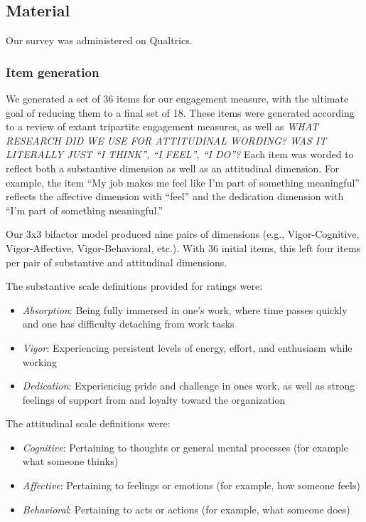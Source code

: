 \documentclass[
  english,
  man]{apa6}
\begin{document}
\hypertarget{material}{%
\subsection{Material}\label{material}}

Our survey was administered on Qualtrics.

\hypertarget{item-generation}{%
\subsubsection{Item generation}\label{item-generation}}

We generated a set of 36 items for our engagement measure, with the ultimate goal of reducing them to a final set of 18. These items were generated according to a review of extant tripartite engagement measures, as well as \emph{WHAT RESEARCH DID WE USE FOR ATTITUDINAL WORDING? WAS IT LITERALLY JUST \enquote{I THINK}, \enquote{I FEEL}, \enquote{I DO}?} Each item was worded to reflect both a substantive dimension as well as an attitudinal dimension. For example, the item \enquote{My job makes me feel like I'm part of something meaningful} reflects the affective dimension with \enquote{feel} and the dedication dimension with \enquote{I'm part of something meaningful.}

Our 3x3 bifactor model produced nine pairs of dimensions (e.g., Vigor-Cognitive, Vigor-Affective, Vigor-Behavioral, etc.). With 36 initial items, this left four items per pair of substantive and attitudinal dimensions.

The substantive scale definitions provided for ratings were:

\begin{itemize}
\item
  \emph{Absorption}: Being fully immersed in one's work, where time passes quickly and one has difficulty detaching from work tasks
\item
  \emph{Vigor}: Experiencing persistent levels of energy, effort, and enthusiasm while working
\item
  \emph{Dedication}: Experiencing pride and challenge in ones work, as well as strong feelings of support from and loyalty toward the organization
\end{itemize}

The attitudinal scale definitions were:

\begin{itemize}
\item
  \emph{Cognitive}: Pertaining to thoughts or general mental processes (for example what someone thinks)
\item
  \emph{Affective}: Pertaining to feelings or emotions (for example, how someone feels)
\item
  \emph{Behavioral}: Pertaining to acts or actions (for example, what someone does)
\end{itemize}
\end{document}
